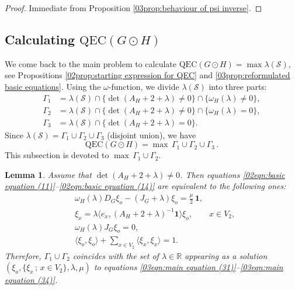 \documentclass[12pt,a4paper]{article}
\newtheorem{lemma}[theorem]{Lemma}
\newcommand{\1}{{\bm 1}}
\numberwithin{equation}{section}
\begin{document}
\begin{proof}
Immediate from 
Proposition \ref{03prop:behaviour of psi inverse}.
\end{proof}



\subsection{Calculating $\mathrm{QEC}(G\odot H)$}

We come back to the main problem to calculate
$\mathrm{QEC}(G\odot H)=\max\lambda(\mathcal{S})$,
see Propositions \ref{02prop:starting expression for QEC} and 
\ref{03prop:reformulated basic equations}.
Using the $\omega$-function, 
we divide $\lambda(\mathcal{S})$ into three parts:
%
\begin{align}
\Gamma_1
&=\lambda(\mathcal{S})
  \cap\{\det(A_H+2+\lambda)\neq0\}
  \cap\{\omega_H(\lambda)\neq0\},
\label{03eqn:def of Gamma1}\\
\Gamma_2
&=\lambda(\mathcal{S})
  \cap\{\det(A_H+2+\lambda)\neq0\}
  \cap\{\omega_H(\lambda)=0\},
\label{03eqn:def of Gamma2}\\
\Gamma_3
&=\lambda(\mathcal{S})
  \cap\{\det(A_H+2+\lambda)=0\}.
\label{03eqn:def of Gamma3}
\end{align}
%
Since $\lambda(\mathcal{S})=\Gamma_1\cup \Gamma_2\cup \Gamma_3$
(disjoint union), we have
%
\begin{equation}\label{04eqn:our goal divided}
\mathrm{QEC}(G\odot H)
=\max\,\Gamma_1\cup \Gamma_2\cup\Gamma_3\,.
\end{equation}
%
This subsection is devoted to 
$\max\,\Gamma_1\cup \Gamma_2$.

\begin{lemma}\label{03lem: basic equations under det neq 0}
Assume that $\det(A_H+2+\lambda)\neq0$.
Then equations 
\eqref{02eqn:basic equation (11)}--\eqref{02eqn:basic equation (14)}
are equivalent to the following ones:
%
\begin{align}
&\omega_H(\lambda)D_G\xi_o-(J_G+\lambda)\xi_o 
=\frac{\mu}{2}\,\mathbf{1},
\label{03eqn:main equation (31)} \\
&\xi_x
=\lambda \langle e_x, (A_H+2+\lambda)^{-1}\mathbf{1}\rangle\xi_o,
\qquad x\in V_2,
\label{03eqn:main equation (32)} \\
&\omega_H(\lambda)J_G\xi_o=0,
\label{03eqn:main equation (33)} \\
&\langle \xi_o, \xi_o\rangle
+\sum_{x\in V_2} \langle \xi_x, \xi_x\rangle=1.
\label{03eqn:main equation (34)}
\end{align}
Therefore, $\Gamma_1\cup \Gamma_2$ coincides with
the set of $\lambda\in\mathbb{R}$ appearing 
as a solution $(\xi_o,\{\xi_x\,;\, x \in V_2\}, \lambda, \mu)$
to equations
\eqref{03eqn:main equation (31)}--\eqref{03eqn:main equation (34)}.
\end{lemma}
\end{document}
